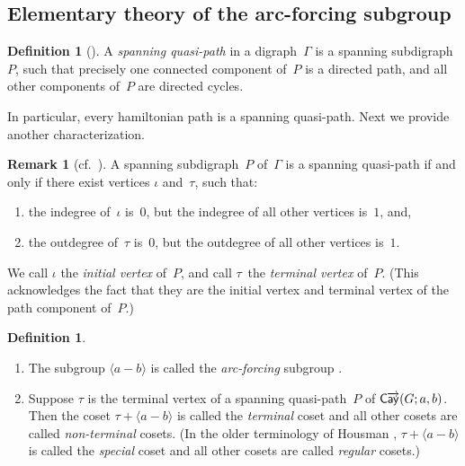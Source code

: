 \documentclass[11pt]{amsart}
\makeatletter
\theoremstyle{definition}
\newtheorem{definition}[equation]{Definition}
\newtheorem{remark}[equation]{Remark}
\numberwithin{case}{startcases}
\newcommand{\noprelistbreak}{\@nobreaktrue\nopagebreak\vskip4pt} %
\numberwithin{equation}{section}
\newcommand{\cayd}{\mathop{\mathsf{C}\mkern-1mu\overrightarrow{\mathsf{ay}}}}
\makeatother
\begin{document}
	
	
	
	\subsection{Elementary theory of the arc-forcing subgroup}
	
	\begin{definition}[{\cite[Defn.~2.6]{ForbushEtal}}]
		A \emph{spanning quasi-path} in a digraph~$\Gamma$ is a spanning subdigraph~$P$, such that precisely one connected component of~$P$ is a directed path, and all other components of~$P$ are directed cycles.
	\end{definition}
	
	In particular, every hamiltonian path is a spanning quasi-path.
	Next we provide another characterization.
	
	\begin{remark}[cf.\ {\cite[Defn.~2.6]{ForbushEtal}}]\label{quasi}
		A spanning subdigraph~$P$ of~$\Gamma$ is a spanning quasi-path if and only if there exist vertices $\iota$ and~$\tau$, such that:
		\begin{enumerate}
			\item the indegree of~$\iota$ is~$0$, but the indegree of all other vertices is~$1$,
			and,
			\item the outdegree of~$\tau$ is~$0$, but the outdegree of all other vertices is~$1$.
		\end{enumerate}
		We call $\iota$ the \emph{initial vertex} of~$P$, and call $\tau$~the \emph{terminal vertex} of~$P$. (This acknowledges the fact that they are the initial vertex and terminal vertex of the path component of~$P$.)
	\end{remark}
	
	\begin{definition}
		\leavevmode\noprelistbreak
		\begin{enumerate}
			\item The subgroup $\langle a - b\rangle$ is called the \emph{arc-forcing} subgroup \cite[\S2.3]{witte1984survey}.
			\item Suppose $\tau$ is the terminal vertex of a spanning quasi-path~$P$ of $\cayd(G; a, b)$. 
			Then the coset $\tau + \langle a - b \rangle$ is called the \emph{terminal} coset \cite[Defn.~5(ii)]{morrisNoHP} and all other cosets are called \emph{non-terminal} cosets. (In the older terminology of Housman \cite{Housman}, $\tau + \langle a - b \rangle$ is called the \emph{special} coset and all other cosets are called \emph{regular} cosets.)
		\end{enumerate}
	\end{definition}
	
\end{document}
